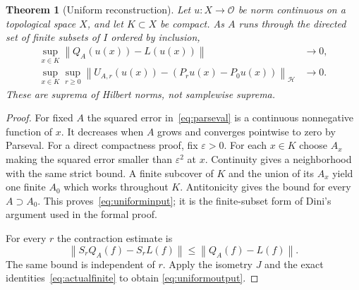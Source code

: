 \documentclass[11pt]{article}
\newtheorem{theorem}{Theorem}[section]
\theoremstyle{remark}\newtheorem{remark}[theorem]{Remark}
\newcommand{\norm}[1]{\left\lVert#1\right\rVert}
\newcommand{\HH}{\mathcal H}
\newcommand{\OO}{\mathcal O}
\begin{document}
\begin{theorem}[Uniform reconstruction]\label{thm:uniform}
Let $u:X\to\OO$ be norm continuous on a topological space $X$,
and let $K\subset X$ be compact. As $A$ runs through the directed
set of finite subsets of $I$ ordered by inclusion,
\begin{align}
 \sup_{x\in K}\norm{Q_A(u(x))-L(u(x))}&\longrightarrow0,
       \label{eq:uniforminput}\\
 \sup_{x\in K}\sup_{r\geq0}
 \norm{U_{A,r}(u(x))-(P_ru(x)-P_0u(x))}_{\HH}
       &\longrightarrow0.\label{eq:uniformoutput}
\end{align}
These are suprema of Hilbert norms, not samplewise suprema.
\end{theorem}
\begin{proof}
For fixed $A$ the squared error in~\eqref{eq:parseval} is a
continuous nonnegative function of $x$. It decreases when $A$ grows
and converges pointwise to zero by Parseval. For a direct compactness
proof, fix $\varepsilon>0$. For each $x\in K$ choose $A_x$ making
the squared error smaller than $\varepsilon^2$ at $x$.
Continuity gives a neighborhood with the same strict bound.
A finite subcover of $K$ and the union of its $A_x$ yield one finite
$A_0$ which works throughout $K$. Antitonicity gives the bound for
every $A\supset A_0$. This proves~\eqref{eq:uniforminput}; it is the
finite-subset form of Dini's argument used in the formal proof.

For every $r$ the contraction estimate is
\[
 \norm{S_rQ_A(f)-S_rL(f)}\leq\norm{Q_A(f)-L(f)}.
\]
The same bound is independent of $r$. Apply the isometry $J$ and
the exact identities~\eqref{eq:actualfinite} to obtain
\eqref{eq:uniformoutput}.
\end{proof}
\end{document}
